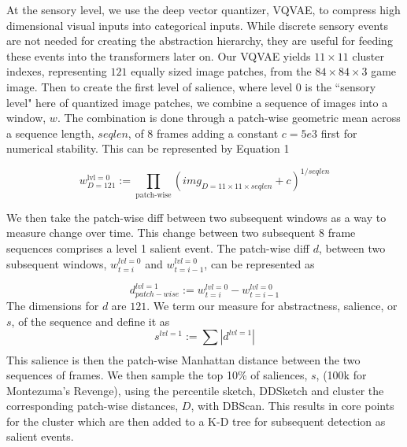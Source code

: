 \documentclass{article}
\begin{document}
At the sensory level, we use the deep vector quantizer, VQVAE, to compress high dimensional visual inputs into categorical inputs. While discrete sensory events are not needed for creating the abstraction hierarchy, they are useful for feeding these events into the transformers later on. Our VQVAE yields $11 \times 11$ cluster indexes, representing $121$ equally sized image patches, from the $84 \times 84 \times 3$ game image. Then to create the first level of salience, where level $0$ is the \textquotedblleft sensory level" here of quantized image patches, we combine a sequence of images into a window, $w$. The combination is done through a patch-wise geometric mean across a sequence length, $seqlen$, of 8 frames adding a constant $c=5e3$ first for numerical stability. This can be represented by
Equation 1

\[
    w_{D=121}^{\text{lvl}=0} :=
    \prod_{\text{patch-wise}} \left(
        img_{D=11 \times 11\times seqlen} + c
    \right) ^ {1/seqlen}
\]


We then take the patch-wise diff between two subsequent windows as a way to measure change over time. This change between two subsequent 8 frame sequences comprises a level 1 salient event. The patch-wise diff $d$, between two subsequent windows, $w^{lvl=0}_{t=i}$ and $w^{lvl=0}_{t=i-1}$, can be represented as

\[
d^{lvl=1}_{patch-wise} :=  w^{lvl=0}_{t=i} - w^{lvl=0}_{t=i-1}
\]
The dimensions for $d$ are $121$. We term our measure for abstractness, salience, or $s$, of the sequence and define it as
\[
s^{lvl=1} := \sum_{} \left| d^{lvl=1} \right|
\]
This salience is then the patch-wise Manhattan distance between the two sequences of frames. We then sample the top 10\% of saliences,  $s$,  (100k for Montezuma's Revenge), using the percentile sketch, DDSketch \cite{Masson_2019} and cluster the corresponding patch-wise distances, $D$, with DBScan\cite{ester1996density}. This results in core points for the cluster which are then added to a K-D tree \cite{bentley1975multidimensional} for subsequent detection as salient events.
\end{document}
